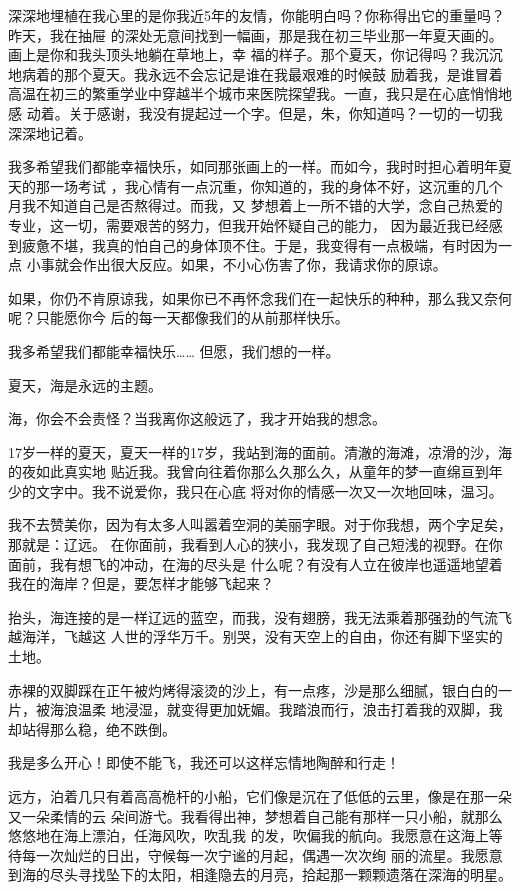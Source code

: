 \documentclass[12pt,a4paper]{article}
\begin{document}
		深深地埋植在我心里的是你我近5年的友情，你能明白吗？你称得出它的重量吗？昨天，我在抽屉
	的深处无意间找到一幅画，那是我在初三毕业那一年夏天画的。画上是你和我头顶头地躺在草地上，幸
	福的样子。那个夏天，你记得吗？我沉沉地病着的那个夏天。我永远不会忘记是谁在我最艰难的时候鼓
	励着我，是谁冒着高温在初三的繁重学业中穿越半个城市来医院探望我。一直，我只是在心底悄悄地感
	动着。关于感谢，我没有提起过一个字。但是，朱，你知道吗？一切的一切我深深地记着。

		我多希望我们都能幸福快乐，如同那张画上的一样。而如今，我时时担心着明年夏天的那一场考试
	，我心情有一点沉重，你知道的，我的身体不好，这沉重的几个月我不知道自己是否熬得过。而我，又
	梦想着上一所不错的大学，念自己热爱的专业，这一切，需要艰苦的努力，但我开始怀疑自己的能力，
	因为最近我已经感到疲惫不堪，我真的怕自己的身体顶不住。于是，我变得有一点极端，有时因为一点
	小事就会作出很大反应。如果，不小心伤害了你，我请求你的原谅。

		如果，你仍不肯原谅我，如果你已不再怀念我们在一起快乐的种种，那么我又奈何呢？只能愿你今
	后的每一天都像我们的从前那样快乐。

		我多希望我们都能幸福快乐…… 但愿，我们想的一样。

	\endwriting



		夏天，海是永远的主题。

		海，你会不会责怪？当我离你这般远了，我才开始我的想念。

		17岁一样的夏天，夏天一样的17岁，我站到海的面前。清澈的海滩，凉滑的沙，海的夜如此真实地
	贴近我。我曾向往着你那么久那么久，从童年的梦一直绵亘到年少的文字中。我不说爱你，我只在心底
	将对你的情感一次又一次地回味，温习。

		我不去赞美你，因为有太多人叫嚣着空洞的美丽字眼。对于你我想，两个字足矣，那就是：辽远。
	在你面前，我看到人心的狭小，我发现了自己短浅的视野。在你面前，我有想飞的冲动，在海的尽头是
	什么呢？有没有人立在彼岸也遥遥地望着我在的海岸？但是，要怎样才能够飞起来？

		抬头，海连接的是一样辽远的蓝空，而我，没有翅膀，我无法乘着那强劲的气流飞越海洋，飞越这
	人世的浮华万千。别哭，没有天空上的自由，你还有脚下坚实的土地。

		赤裸的双脚踩在正午被灼烤得滚烫的沙上，有一点疼，沙是那么细腻，银白白的一片，被海浪温柔
	地浸湿，就变得更加妩媚。我踏浪而行，浪击打着我的双脚，我却站得那么稳，绝不跌倒。

		我是多么开心！即使不能飞，我还可以这样忘情地陶醉和行走！

		远方，泊着几只有着高高桅杆的小船，它们像是沉在了低低的云里，像是在那一朵又一朵柔情的云
	朵间游弋。我看得出神，梦想着自己能有那样一只小船，就那么悠悠地在海上漂泊，任海风吹，吹乱我
	的发，吹偏我的航向。我愿意在这海上等待每一次灿烂的日出，守候每一次宁谧的月起，偶遇一次次绚
	丽的流星。我愿意到海的尽头寻找坠下的太阳，相逢隐去的月亮，拾起那一颗颗遗落在深海的明星。
\end{document}
